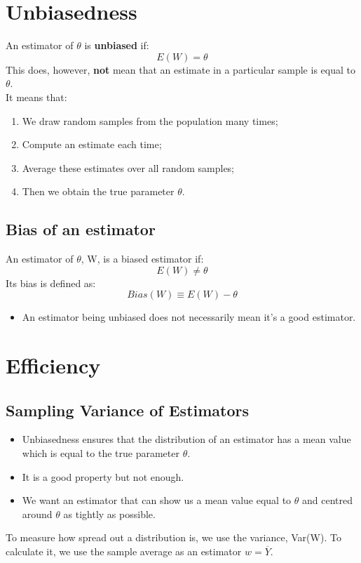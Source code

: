 \documentclass[11pt,a4paper]{report}
\begin{document}
\section{Unbiasedness}
An estimator of $\theta$ is \textbf{unbiased} if: \[E(W) = \theta\]
This does, however, \textbf{not} mean that an estimate in a particular sample is equal to $\theta$.
\\It means that:
\begin{enumerate}
    \item We draw random samples from the population many times;
    \item Compute an estimate each time;
    \item Average these estimates over all random samples;
    \item Then we obtain the true parameter $\theta$.
\end{enumerate}

\subsection{Bias of an estimator}
An estimator of $\theta$, W, is a biased estimator if:
\[E(W) \neq \theta\]
Its bias is defined as:
\[Bias(W) \equiv E(W) - \theta\]


\begin{itemize}
    \item An estimator being unbiased does not necessarily mean it's a good estimator.
\end{itemize}

\section{Efficiency}
\subsection{Sampling Variance of Estimators}
\begin{itemize}
    \item Unbiasedness ensures that the distribution of an estimator has a mean value which is equal to the true parameter $\theta$.
    \item It is a good property but not enough.
    \item We want an estimator that can show us a mean value equal to $\theta$ and centred around $\theta$ as tightly as possible.
\end{itemize}
To measure how spread out a distribution is, we use the variance, Var(W). To calculate it, we use the sample average as an estimator $w = \overline{Y}$.
\end{document}
